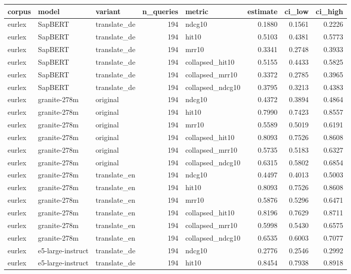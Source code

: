 \begin{tabular}{lllrlrrr}
\toprule
corpus & model & variant & n\_queries & metric & estimate & ci\_low & ci\_high \\
\midrule
eurlex & SapBERT & translate\_de & 194 & ndcg10 & 0.1880 & 0.1561 & 0.2226 \\
eurlex & SapBERT & translate\_de & 194 & hit10 & 0.5103 & 0.4381 & 0.5773 \\
eurlex & SapBERT & translate\_de & 194 & mrr10 & 0.3341 & 0.2748 & 0.3933 \\
eurlex & SapBERT & translate\_de & 194 & collapsed\_hit10 & 0.5155 & 0.4433 & 0.5825 \\
eurlex & SapBERT & translate\_de & 194 & collapsed\_mrr10 & 0.3372 & 0.2785 & 0.3965 \\
eurlex & SapBERT & translate\_de & 194 & collapsed\_ndcg10 & 0.3795 & 0.3213 & 0.4383 \\
eurlex & granite-278m & original & 194 & ndcg10 & 0.4372 & 0.3894 & 0.4864 \\
eurlex & granite-278m & original & 194 & hit10 & 0.7990 & 0.7423 & 0.8557 \\
eurlex & granite-278m & original & 194 & mrr10 & 0.5589 & 0.5019 & 0.6191 \\
eurlex & granite-278m & original & 194 & collapsed\_hit10 & 0.8093 & 0.7526 & 0.8608 \\
eurlex & granite-278m & original & 194 & collapsed\_mrr10 & 0.5735 & 0.5183 & 0.6327 \\
eurlex & granite-278m & original & 194 & collapsed\_ndcg10 & 0.6315 & 0.5802 & 0.6854 \\
eurlex & granite-278m & translate\_en & 194 & ndcg10 & 0.4497 & 0.4013 & 0.5003 \\
eurlex & granite-278m & translate\_en & 194 & hit10 & 0.8093 & 0.7526 & 0.8608 \\
eurlex & granite-278m & translate\_en & 194 & mrr10 & 0.5876 & 0.5296 & 0.6471 \\
eurlex & granite-278m & translate\_en & 194 & collapsed\_hit10 & 0.8196 & 0.7629 & 0.8711 \\
eurlex & granite-278m & translate\_en & 194 & collapsed\_mrr10 & 0.5998 & 0.5430 & 0.6575 \\
eurlex & granite-278m & translate\_en & 194 & collapsed\_ndcg10 & 0.6535 & 0.6003 & 0.7077 \\
eurlex & e5-large-instruct & translate\_de & 194 & ndcg10 & 0.2776 & 0.2546 & 0.2992 \\
eurlex & e5-large-instruct & translate\_de & 194 & hit10 & 0.8454 & 0.7938 & 0.8918 \\

\end{tabular}

